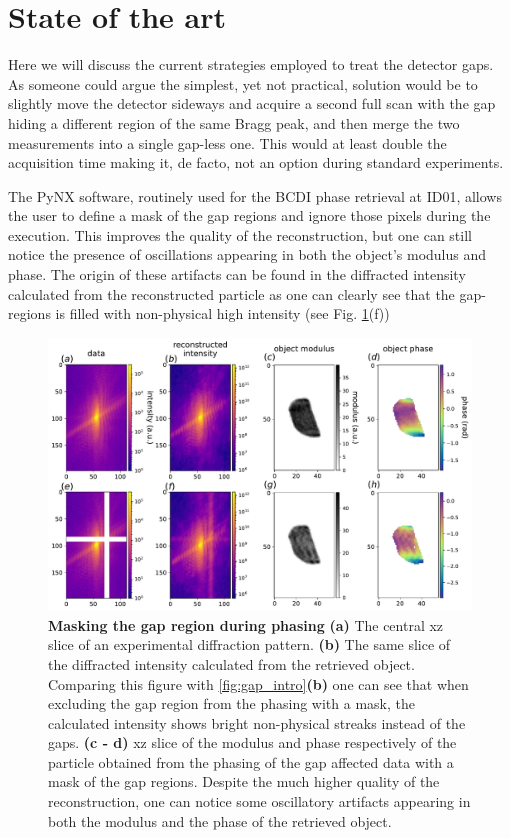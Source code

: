 \section{State of the art}\label{sec:InpStateArt}

Here we will discuss the current strategies employed to treat the detector gaps. As someone could argue the simplest,
yet not practical, solution would be to slightly move the detector sideways and acquire a second full scan with the
gap hiding a different region of the same Bragg peak, and then merge the two measurements into a single gap-less one. 
This would at least double the acquisition time making it, de facto, not an option during standard experiments. 

The PyNX software, routinely used for the BCDI phase retrieval at ID01, allows the user to define a mask of the gap 
regions and ignore those pixels during the execution. This improves the quality of the reconstruction, 
but one can still notice the presence of oscillations appearing in both the object's modulus and phase.
The origin of these artifacts can be found in the diffracted intensity calculated from the reconstructed particle as 
one can clearly see that the gap-regions is filled with non-physical high intensity (see Fig. \ref{fig:gap_intro_mask}(f))

\begin{figure}[h]
    \includegraphics[width=\textwidth]{figures/Inpainting/gaps_mask.pdf}
    \caption{\textbf{Masking the gap region during phasing} 
    \textbf{(a)} The central xz slice of an experimental diffraction pattern. \textbf{(b)} The same slice of the diffracted
    intensity calculated from the retrieved object. Comparing this figure with \ref{fig:gap_intro}\textbf{(b)} one can see that
    when excluding the gap region from the phasing with a mask, the calculated intensity shows bright non-physical streaks 
    instead of the gaps. \textbf{(c - d)} xz slice of the modulus and phase respectively of the particle obtained from the 
    phasing of the gap affected data with a mask of the gap regions. Despite the much higher quality of the reconstruction, 
    one can notice some oscillatory artifacts appearing in both the modulus and the phase of the retrieved object. }
    \label{fig:gap_intro_mask}
\end{figure}


